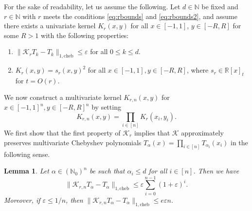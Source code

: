 \documentclass[11pt]{article}
\newcommand{\N}{\mathbb{N}}
\newcommand{\R}{\mathbb{R}}
\renewcommand{\epsilon}{\varepsilon}
\newcommand{\eps}{\epsilon}
\newtheorem{lemma}[defin]{Lemma}
\theoremstyle{definition}
\newcommand{\cheb}{{1,\mathrm{cheb}}}
\begin{document}
For the sake of readability, let us assume the following.
Let $d \in \N$ be fixed and $r \in \N$ with $r$ meets the conditions \eqref{eq:rbounds} and \eqref{eq:rbounds2}, and assume there exists a univariate kernel $K_r(x,y)$ for all $x \in [-1,1]$, $y \in [-R,R]$ for some $R>1$ with the following properties:
\begin{enumerate}
\item $\|\mathcal K_r T_k - T_k \|_\cheb \leq \eps$ for all $0 \leq k \leq d$.
\item $K_r(x,y) = s_r(x,y)^2$ for all $x \in [-1,1], y \in [-R,R]$, where $s_r \in \R[x]_t$ for $t = O(r)$.
\end{enumerate}

We now construct a multivariate kernel $K_{r,n}(x,y)$ for $x \in [-1,1]^n, y \in [-R,R]^n$ by setting
\[
K_{r,n}(x,y) = \prod_{i \in [n]} K_r(x_i,y_i).
\]
We first show that the first property of $\mathcal K_r$ implies that $\mathcal K$ approximately preserves multivariate Chebyshev polynomials $T_\alpha(x) = \prod_{i \in [n]} T_{\alpha_i}(x_i)$ in the following sense.
\begin{lemma} \label{thrm:approxIDmulti}
    Let $\alpha \in (\N_0)^n$ be such that $\alpha_i \leq d$ for all $i \in [n]$. Then we have
    \[
    \|\mathcal K_{r,n} T_\alpha - T_\alpha\|_\cheb \leq \eps \sum_{i=0}^{n-1} (1+\eps)^i.
    \]
    Moreover, if $\eps \leq 1/n$, then $\|\mathcal K_{r,n} T_\alpha - T_\alpha\|_\cheb \leq e \eps n$.
\end{lemma}
\end{document}
